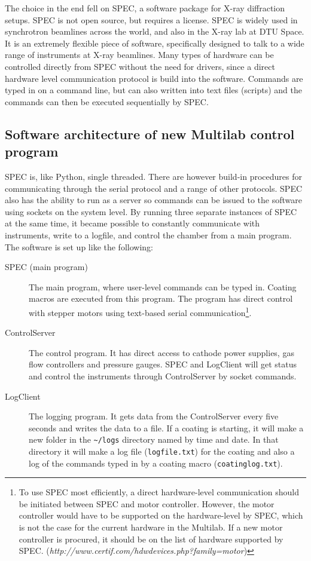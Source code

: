 The choice in the end fell on SPEC, a software package for X-ray diffraction setups. SPEC is not open source, but requires a license. SPEC is widely used in synchrotron beamlines across the world, and also in the X-ray lab at DTU Space. It is an extremely flexible piece of software, specifically designed to talk to a wide range of instruments at X-ray beamlines. Many types of hardware can be controlled directly from SPEC without the need for drivers, since a direct hardware level communication protocol is build into the software. Commands are typed in on a command line, but can also written into text files (scripts) and the commands can then be executed sequentially by SPEC.

\subsection{Software architecture of new Multilab control program}
SPEC is, like Python, single threaded. There are however build-in procedures for communicating through the serial protocol and a range of other protocols. SPEC also has the ability to run as a server so commands can be issued to the software using sockets on the system level. By running three separate instances of SPEC at the same time, it became possible to constantly communicate with instruments, write to a logfile, and control the chamber from a main program. The software is set up like the following:

\begin{description}
  \item[SPEC (main program)] The main program, where user-level commands can be typed in. Coating macros are executed from this program. The program has direct control with stepper motors using text-based serial communication\footnote{To use SPEC most efficiently, a direct hardware-level communication should be initiated between SPEC and motor controller. However, the motor controller would have to be supported on the hardware-level by SPEC, which is not the case for the current hardware in the Multilab. If a new motor controller is procured, it should be on the list of hardware supported by SPEC. (\emph{http://www.certif.com/hdwdevices.php?family=motor})}.
  \item[ControlServer] The control program. It has direct access to cathode power supplies, gas flow controllers and pressure gauges. SPEC and LogClient will get status and control the instruments through ControlServer by socket commands.
  \item[LogClient] The logging program. It gets data from the ControlServer every five seconds and writes the data to a file. If a coating is starting, it will make a new folder in the \verb'~/logs' directory named by time and date. In that directory it will make a log file (\verb'logfile.txt') for the coating and also a log of the commands typed in by a coating macro (\verb'coatinglog.txt').
\end{description}

